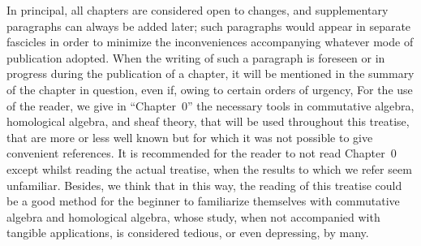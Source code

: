 \bigskip

In principal, all chapters are considered open to changes, and supplementary
paragraphs can always be added later; such paragraphs would appear in separate
fascicles in order to minimize the inconveniences accompanying whatever mode of
publication adopted. When the writing of such a paragraph is foreseen or in
progress during the publication of a chapter, it will be mentioned in the
summary of the chapter in question, even if, owing to certain orders of urgency,
 For the use of
the reader, we give in ``Chapter~0'' the necessary tools in commutative algebra,
homological algebra, and sheaf theory, that will be used throughout this
treatise, that are more or less well known but for which it was not possible to
give convenient references. It is recommended for the reader to not read
Chapter~0 except whilst reading the actual treatise, when the results to which
we refer
seem unfamiliar. Besides, we think that in this way, the
reading of this treatise could be a good method for the beginner to familiarize
themselves with commutative algebra and homological algebra, whose study, when
not accompanied with tangible applications, is considered tedious, or even
depressing, by many.

\sectionbreak

